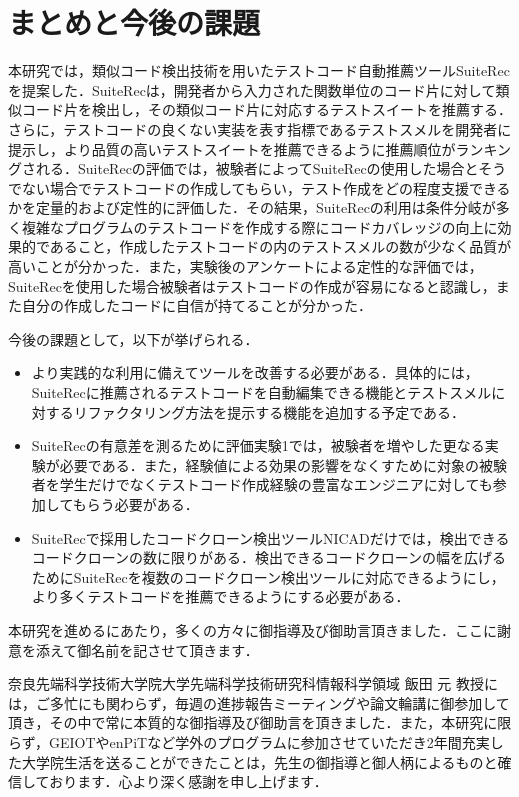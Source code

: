 \documentclass[12pt]{jarticle} %
\begin{document}
\section{まとめと今後の課題}
本研究では，類似コード検出技術を用いたテストコード自動推薦ツール{\sf SuiteRec}を提案した．{\sf SuiteRec}は，開発者から入力された関数単位のコード片に対して類似コード片を検出し，その類似コード片に対応するテストスイートを推薦する．さらに，テストコードの良くない実装を表す指標であるテストスメルを開発者に提示し，より品質の高いテストスイートを推薦できるように推薦順位がランキングされる．{\sf SuiteRec}の評価では，被験者によって{\sf SuiteRec}の使用した場合とそうでない場合でテストコードの作成してもらい，テスト作成をどの程度支援できるかを定量的および定性的に評価した．その結果，{\sf SuiteRec}の利用は条件分岐が多く複雑なプログラムのテストコードを作成する際にコードカバレッジの向上に効果的であること，作成したテストコードの内のテストスメルの数が少なく品質が高いことが分かった．また，実験後のアンケートによる定性的な評価では，{\sf SuiteRec}を使用した場合被験者はテストコードの作成が容易になると認識し，また自分の作成したコードに自信が持てることが分かった．

今後の課題として，以下が挙げられる．

\begin{itemize}
\item より実践的な利用に備えてツールを改善する必要がある．具体的には，{\sf SuiteRec}に推薦されるテストコードを自動編集できる機能とテストスメルに対するリファクタリング方法を提示する機能を追加する予定である．
\item {\sf SuiteRec}の有意差を測るために評価実験1では，被験者を増やした更なる実験が必要である．また，経験値による効果の影響をなくすために対象の被験者を学生だけでなくテストコード作成経験の豊富なエンジニアに対しても参加してもらう必要がある．
\item {\sf SuiteRec}で採用したコードクローン検出ツールNICADだけでは，検出できるコードクローンの数に限りがある．検出できるコードクローンの幅を広げるために{\sf SuiteRec}を複数のコードクローン検出ツールに対応できるようにし，より多くテストコードを推薦できるようにする必要がある．
\end{itemize}


%
%
\acknowledgements

本研究を進めるにあたり，多くの方々に御指導及び御助言頂きました．ここに謝意を添えて御名前を記させて頂きます．

奈良先端科学技術大学院大学先端科学技術研究科情報科学領域 飯田 元 教授には，ご多忙にも関わらず，毎週の進捗報告ミーティングや論文輪講に御参加して頂き，その中で常に本質的な御指導及び御助言を頂きました．また，本研究に限らず，GEIOTやenPiTなど学外のプログラムに参加させていただき2年間充実した大学院生活を送ることができたことは，先生の御指導と御人柄によるものと確信しております．心より深く感謝を申し上げます．
\end{document}

